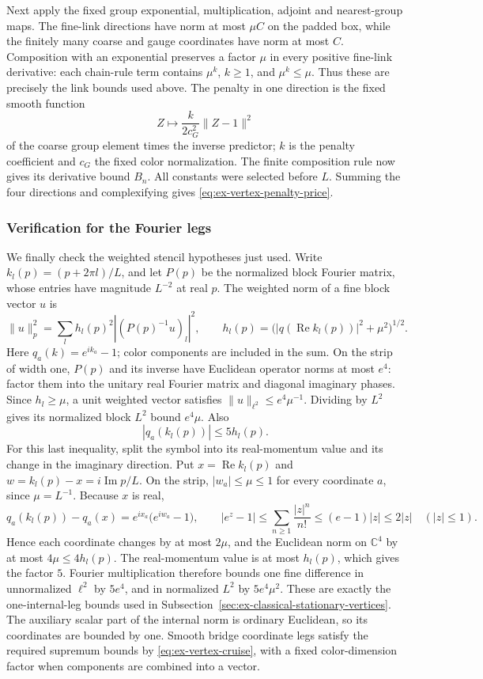 Next apply the fixed group exponential, multiplication, adjoint and
nearest-group maps. The fine-link directions
have norm at most $\mu C$ on the padded box, while the finitely many
coarse and gauge coordinates have norm at most $C$. Composition with
an exponential preserves a factor $\mu$ in every positive fine-link
derivative: each chain-rule term contains $\mu^k$, $k\geq1$, and
$\mu^k\leq\mu$. Thus these are precisely the link bounds used above.
The penalty in one direction is the fixed smooth function
\[
             Z\longmapsto \frac{k}{2c_G^2}\|Z-1\|^2
\]
of the coarse group element times the inverse predictor; $k$ is the
penalty coefficient and $c_G$ the fixed color normalization.
The finite composition rule now gives its derivative bound $B_n$.
All constants were selected before $L$. Summing the four directions
and complexifying gives \eqref{eq:ex-vertex-penalty-price}.

\subsubsection{Verification for the Fourier legs}
We finally check the weighted stencil hypotheses just used. Write
$k_l(p)=(p+2\pi l)/L$, and let $P(p)$ be the normalized block Fourier
matrix, whose entries have magnitude $L^{-2}$ at real $p$. The weighted
norm of a fine block vector $u$ is
\[
 \|u\|_p^2=\sum_l h_l(p)^2
                 |(P(p)^{-1}u)_l|^2,\qquad
 h_l(p)=\bigl(|q(\operatorname{Re}k_l(p))|^2+\mu^2\bigr)^{1/2}.
\]
Here $q_a(k)=e^{ik_a}-1$; color components are included in the sum.
On the strip of width one, $P(p)$ and its inverse have Euclidean
operator norms at most $e^4$: factor them into the unitary real Fourier
matrix and diagonal imaginary phases. Since $h_l\geq\mu$, a unit
weighted vector satisfies $\|u\|_{\ell^2}\leq e^4\mu^{-1}$.
Dividing by $L^2$ gives its normalized block $L^2$ bound $e^4\mu$.
Also
\[
 |q_a(k_l(p))|\leq5h_l(p).
\]
For this last inequality, split the symbol into its real-momentum value
and its change in the imaginary direction. Put $x=\operatorname{Re}k_l(p)$
and $w=k_l(p)-x=i\operatorname{Im}p/L$. On the strip,
$|w_a|\leq\mu\leq1$ for every coordinate $a$, since $\mu=L^{-1}$. Because
$x$ is real,
\[
 q_a(k_l(p))-q_a(x)=e^{ix_a}\bigl(e^{iw_a}-1\bigr),\qquad
 |e^{z}-1|\leq\sum_{n\geq1}\frac{|z|^n}{n!}\leq(e-1)|z|\leq2|z|
 \quad(|z|\leq1).
\]
Hence each coordinate changes by at most $2\mu$, and the Euclidean norm
on $\mathbb C^4$ by at most $4\mu\leq4h_l(p)$. The real-momentum value
is at most $h_l(p)$, which gives the factor $5$. Fourier multiplication therefore bounds
one fine difference in unnormalized $\ell^2$ by $5e^4$, and in
normalized $L^2$ by $5e^4\mu^2$. These are exactly the one-internal-leg
bounds used in Subsection~\ref{sec:ex-classical-stationary-vertices}.
The auxiliary scalar part of the internal norm is ordinary Euclidean,
so its coordinates are bounded by one. Smooth bridge coordinate legs
satisfy the required supremum bounds by
\eqref{eq:ex-vertex-cruise}, with a fixed color-dimension factor when
components are combined into a vector.

